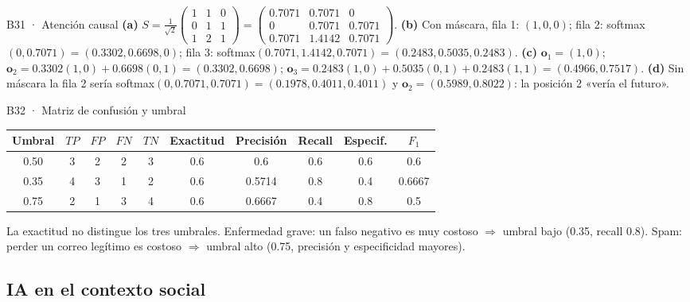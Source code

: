 \begin{solucion}{B31 · Atención causal}
\textbf{(a)} $S=\frac1{\sqrt2}\begin{pmatrix}1&1&0\\0&1&1\\1&2&1\end{pmatrix}=\begin{pmatrix}0.7071&0.7071&0\\0&0.7071&0.7071\\0.7071&1.4142&0.7071\end{pmatrix}$.
\textbf{(b)} Con máscara, fila 1: $(1,0,0)$; fila 2: softmax$(0,0.7071)=(0.3302,0.6698,0)$; fila 3: softmax$(0.7071,1.4142,0.7071)=(0.2483,0.5035,0.2483)$.
\textbf{(c)} $\mathbf o_1=(1,0)$; $\mathbf o_2=0.3302(1,0)+0.6698(0,1)=(0.3302,0.6698)$; $\mathbf o_3=0.2483(1,0)+0.5035(0,1)+0.2483(1,1)=(0.4966,0.7517)$.
\textbf{(d)} Sin máscara la fila 2 sería softmax$(0,0.7071,0.7071)=(0.1978,0.4011,0.4011)$ y $\mathbf o_2=(0.5989,0.8022)$: la posición 2 «vería el futuro».
\end{solucion}

\begin{solucion}{B32 · Matriz de confusión y umbral}
\begin{center}\small
\begin{tabular}{c|cccc|ccccc}
\toprule
Umbral & $TP$ & $FP$ & $FN$ & $TN$ & Exactitud & Precisión & Recall & Especif. & $F_1$\\\midrule
0.50 & 3 & 2 & 2 & 3 & 0.6 & 0.6 & 0.6 & 0.6 & 0.6\\
0.35 & 4 & 3 & 1 & 2 & 0.6 & 0.5714 & 0.8 & 0.4 & 0.6667\\
0.75 & 2 & 1 & 3 & 4 & 0.6 & 0.6667 & 0.4 & 0.8 & 0.5\\\bottomrule
\end{tabular}
\end{center}
La exactitud no distingue los tres umbrales. Enfermedad grave: un falso negativo es muy costoso $\Rightarrow$ umbral bajo (0.35, recall 0.8).
Spam: perder un correo legítimo es costoso $\Rightarrow$ umbral alto (0.75, precisión y especificidad mayores).
\end{solucion}

\subsection{IA en el contexto social}

